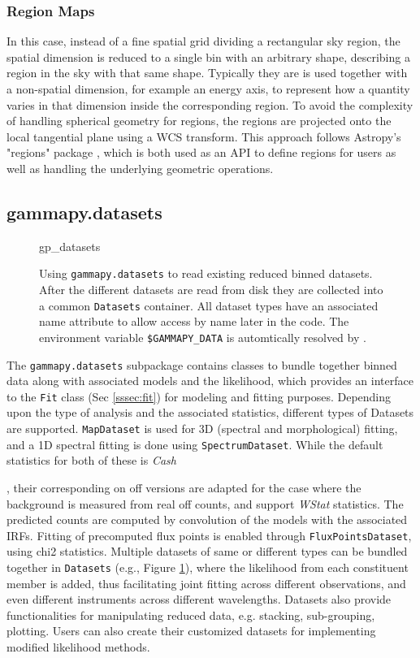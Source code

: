 \documentclass[traditabstract, longauth]{aa}
\newcommand{\code}[1]{\texttt{#1}}
\begin{document}
{\subsubsection{Region Maps}
In this case, instead of a fine spatial grid
dividing a rectangular sky region, the spatial dimension is reduced to a single
bin with an arbitrary shape, describing a region in the sky with that same
shape. Typically they are is used together with a non-spatial dimension, for
example an energy axis, to represent how a quantity varies in that dimension
inside the corresponding region. To avoid the complexity of handling
spherical geometry for regions, the regions are projected onto the local
tangential plane using a WCS transform. This approach follows Astropy's "regions"
package \citep{AstropyRegions2022}, which is both used as an API to define regions
for users as well as handling the underlying geometric operations.


\subsection{gammapy.datasets}
\label{ssec:gammapy-datasets}
%
\begin{figure}
	{gp_datasets}
	\caption{
        Using \code{gammapy.datasets} to read existing reduced binned datasets.
        After the different datasets are read from disk they are collected into a
        common \code{Datasets} container. All dataset types have an associated
        name attribute to allow access by name later in the code. The
        environment variable \code{\$GAMMAPY\_DATA} is automtically resolved
        by \gammapy.
    }
	\label{fig*:minted:gp_datasets}
\end{figure}
%
The \code{gammapy.datasets} subpackage contains classes to bundle
together binned data along with associated models and the likelihood, which
provides an interface to the \code{Fit} class (Sec \ref{sssec:fit}) for
modeling and fitting purposes. Depending upon the type of analysis and the
associated statistics, different types of Datasets are supported. \code{MapDataset} is
used for 3D (spectral and morphological) fitting, and a 1D spectral fitting is
done using \code{SpectrumDataset}. While the default statistics for both of these is
\emph{Cash}}, their corresponding on off versions are adapted for the case where the
background is measured from real off counts, and support \emph{WStat} statistics. The
predicted counts are computed by convolution of the models with the associated
IRFs. Fitting of precomputed flux points is enabled through \code{FluxPointsDataset},
using chi2 statistics. Multiple datasets of same or different types can be
bundled together in \code{Datasets} (e.g., Figure \ref{fig*:minted:gp_datasets}),
where the likelihood from each constituent member is added, thus facilitating
joint fitting across different observations, and even different instruments
across different wavelengths. Datasets also provide functionalities for
manipulating reduced data, e.g. stacking, sub-grouping, plotting. Users can
also create their customized datasets for implementing modified likelihood
methods.
\end{document}

